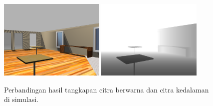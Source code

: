 \begin{figure}[ht]
  \centering
  \includegraphics[width=0.45\textwidth,keepaspectratio]{gambar/citra-depth-camera-rgb-simulasi.png}
  \includegraphics[width=0.45\textwidth,keepaspectratio]{gambar/citra-depth-camera-depth-simulasi.png}
  \caption{Perbandingan hasil tangkapan citra berwarna dan citra kedalaman di simulasi.}
  \label{fig:depthcamerasimulasi}
\end{figure}
